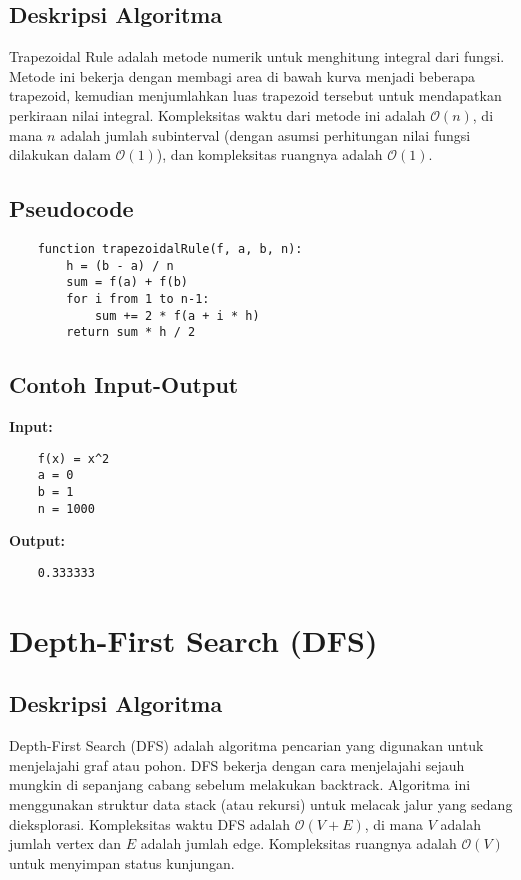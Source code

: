 \subsection{Deskripsi Algoritma}
Trapezoidal Rule adalah metode numerik untuk menghitung integral dari fungsi. Metode ini bekerja dengan membagi area di bawah kurva menjadi beberapa trapezoid, kemudian menjumlahkan luas trapezoid tersebut untuk mendapatkan perkiraan nilai integral. Kompleksitas waktu dari metode ini adalah $\mathcal{O}(n)$, di mana $n$ adalah jumlah subinterval (dengan asumsi perhitungan nilai fungsi dilakukan dalam $\mathcal{O}(1)$), dan kompleksitas ruangnya adalah $\mathcal{O}(1)$.

\subsection{Pseudocode}
\begin{verbatim}
    function trapezoidalRule(f, a, b, n):
        h = (b - a) / n
        sum = f(a) + f(b)
        for i from 1 to n-1:
            sum += 2 * f(a + i * h)
        return sum * h / 2
\end{verbatim}

\subsection{Contoh Input-Output}
\textbf{Input:}
\begin{verbatim}
    f(x) = x^2
    a = 0
    b = 1
    n = 1000
\end{verbatim}

\textbf{Output:}
\begin{verbatim}
    0.333333
\end{verbatim}

\section{Depth-First Search (DFS)}
\label{sec:dfs-implementation}

\subsection{Deskripsi Algoritma}
Depth-First Search (DFS) adalah algoritma pencarian yang digunakan untuk menjelajahi graf atau pohon. DFS bekerja dengan cara menjelajahi sejauh mungkin di sepanjang cabang sebelum melakukan backtrack. Algoritma ini menggunakan struktur data stack (atau rekursi) untuk melacak jalur yang sedang dieksplorasi. Kompleksitas waktu DFS adalah $\mathcal{O}\left(V + E\right)$, di mana $V$ adalah jumlah vertex dan $E$ adalah jumlah edge. Kompleksitas ruangnya adalah $\mathcal{O}\left(V\right)$ untuk menyimpan status kunjungan.

